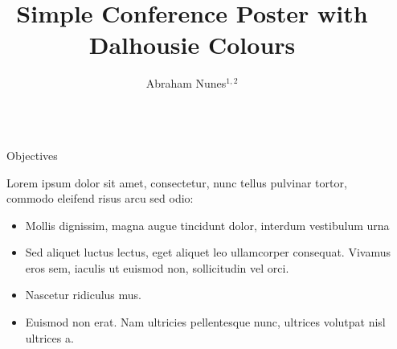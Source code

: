 \documentclass[final]{beamer}
\title{Simple Conference Poster with Dalhousie Colours} %
\author{Abraham Nunes$^{1,2}$} %
\institute{$^{1}$First Institution Here \\ [0.5ex]
		   $^{2}$Second Institution Here} %
\newlength{\sepwid}
\newlength{\onecolwid}
\begin{document}

\setlength{\belowcaptionskip}{2ex} %
\setlength\belowdisplayshortskip{2ex} %

\begin{frame}[t] %

\begin{columns}[t] %

\begin{column}{\sepwid}\end{column} %

\begin{column}{\onecolwid} %



\begin{alertblock}{Objectives}

Lorem ipsum dolor sit amet, consectetur, nunc tellus pulvinar tortor, commodo eleifend risus arcu sed odio:
\begin{itemize}
\item Mollis dignissim, magna augue tincidunt dolor, interdum vestibulum urna
\item Sed aliquet luctus lectus, eget aliquet leo ullamcorper consequat. Vivamus eros sem, iaculis ut euismod non, sollicitudin vel orci.
\item Nascetur ridiculus mus.  
\item Euismod non erat. Nam ultricies pellentesque nunc, ultrices volutpat nisl ultrices a.
\end{itemize}

\end{alertblock}


\end{column}
\end{columns}
\end{frame}
\end{document}
